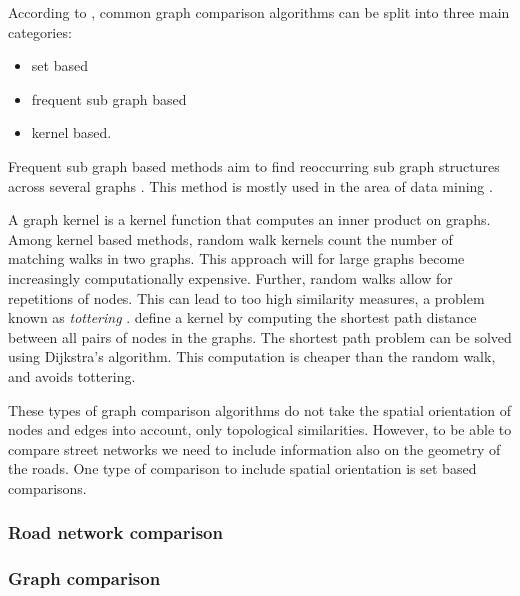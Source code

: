 According to \cite{graphlet_kernels}, common graph comparison algorithms can be split into three main categories: 
\begin{itemize}
    \item set based
    \item frequent sub graph based
    \item kernel based.
\end{itemize}
Frequent sub graph based methods aim to find reoccurring sub graph structures across several graphs \citep{subgraphmatching}. This method is mostly used in the area of data mining \citep{subsurvey}.

A graph kernel is a kernel function that computes an inner product on graphs. Among kernel based methods, random walk kernels count the number of matching walks in two graphs. This approach will for large graphs become increasingly computationally expensive. Further, random walks allow for repetitions of nodes. This can lead to too high similarity measures, a problem known as \textit{tottering} \citep{shortestpath}. \cite{shortestpath} define a kernel by computing the shortest path distance between all pairs of nodes in the graphs. The shortest path problem can be solved using Dijkstra's algorithm. This computation is cheaper than the random walk, and avoids tottering. 

These types of graph comparison algorithms do not take the spatial orientation of nodes and edges into account, only topological similarities. However, to be able to compare street networks we need to include information also on the geometry of the roads. One type of comparison to include spatial orientation is set based comparisons.













\iffalse
\subsubsection{Road network comparison}

\subsubsection{Graph comparison}

